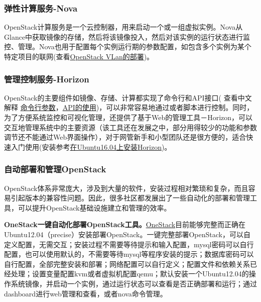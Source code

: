 \documentclass[letterpaper,10pt,english]{sphinxmanual}
\begin{document}
\subsubsection{弹性计算服务-Nova}
\label{gispark_cloud:_u5f39_u6027_u8ba1_u7b97_u670d_u52a1-Nova}
OpenStack计算服务是一个云控制器，用来启动一个或一组虚拟实例。Nova从Glance中获取镜像的存储，然后将该镜像投入，然后对该实例的运行状态进行监控、管理。Nova也用于配置每个实例运行期的参数配置，如包含多个实例为某个特定项目的联网(查看\href{http://my.oschina.net/u/177808/blog/56338}{OpenStack
VLan的部署})。


\subsubsection{管理控制服务-Horizon}
\label{gispark_cloud:_u7ba1_u7406_u63a7_u5236_u670d_u52a1-Horizon}
OpenStack的主要组件如镜像、存储、计算都实现了命令行和API接口(
查看中文解释
\href{http://my.oschina.net/hjswust/blog/120954}{命令行参数}，\href{http://my.oschina.net/guol/blog/105430}{API的使用})，可以非常容易地通过或者脚本进行控制。同时，为了方便系统监控和可视化管理，还提供了基于Web的管理工具－Horizon，可以交互地管理系统中的主要资源（该工具还在发展之中，部分用得较少的功能和参数调节还不能通过Web界面操作），对于网管新手和小型团队还是很方便的，适合快速入门使用(安装参考\href{https://developer.rackspace.com/blog/keystone\_horizon\_nginx\_Ubuntu\_1604/}{在Ubuntu16.04上安装Horizon})。


\subsubsection{自动部署和管理OpenStack}
\label{gispark_cloud:_u81ea_u52a8_u90e8_u7f72_u548c_u7ba1_u7406OpenStack}
OpenStack体系非常庞大，涉及到大量的软件，安装过程相对繁琐和复杂，而且容易引起版本的兼容性问题。因此，很多社区都发展出了一些自动化的部署和管理工具，可以提升OpenStack基础设施建立和管理的效率。

\textbf{OneStack一键自动化部署OpenStack工具。}\href{http://www.oschina.net/p/onestack}{OneStack}目前能够完整而正确在Ubuntu12.04（precise）安装部署OpenStack。一键完整部署OpenStack，可以自定义配置，无需交互；安装过程不需要等待提示和输入配置，mysql密码可以自行配置，也可以使用默认的，不需要等待mysql等程序安装的提示；数据库密码可以自行配置，全部完整安装和部署；网络配置可以自行定义；配置文件和依赖关系已经处理；设置变量配置kvm或者虚拟机配置qemu；默认安装一个Ubuntu12.04的操作系统镜像，并启动一个实例，通过运行状态可以查看是否正确部署和运行；通过dashboard进行web管理和查看，或者nova命令管理。
\end{document}
